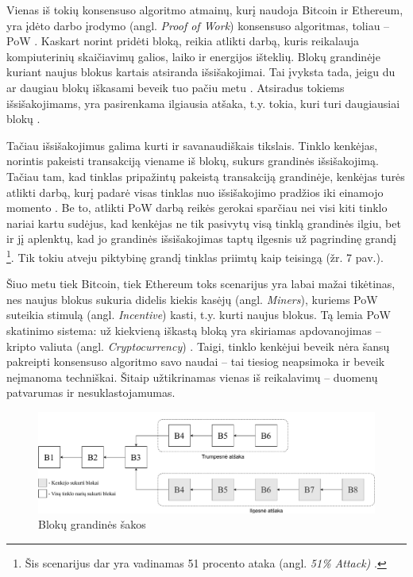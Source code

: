 Vienas iš tokių konsensuso algoritmo atmainų, kurį naudoja Bitcoin ir Ethereum, yra įdėto darbo įrodymo (angl. \textit{Proof of Work}) konsensuso algoritmas, toliau – PoW \cite{gervais2016security}. Kaskart norint pridėti bloką, reikia atlikti darbą, kuris reikalauja kompiuterinių skaičiavimų galios, laiko ir energijos išteklių. Blokų grandinėje kuriant naujus blokus kartais atsiranda išsišakojimai. Tai įvyksta tada, jeigu du ar daugiau blokų iškasami beveik tuo pačiu metu \cite{zheng2017overview}. Atsiradus tokiems išsišakojimams, yra pasirenkama ilgiausia atšaka, t.y. tokia, kuri turi daugiausiai blokų \cite{zheng2017overview}. 

Tačiau išsišakojimus galima kurti ir savanaudiškais tikslais. Tinklo kenkėjas, norintis pakeisti transakciją viename iš blokų, sukurs grandinės išsišakojimą. Tačiau tam, kad tinklas pripažintų pakeistą transakciją grandinėje, kenkėjas turės atlikti darbą, kurį padarė visas tinklas nuo išsišakojimo pradžios iki einamojo momento \cite{nakamoto2008bitcoin}. Be to, atlikti PoW darbą reikės gerokai sparčiau nei visi kiti tinklo nariai kartu sudėjus, kad kenkėjas ne tik pasivytų visą tinklą grandinės ilgiu, bet ir jį aplenktų, kad jo grandinės išsišakojimas taptų ilgesnis už pagrindinę grandį \cite{nakamoto2008bitcoin}\footnote{Šis scenarijus dar yra vadinamas 51 procento ataka (angl. \textit{51\% Attack)} \cite{baliga2017understanding}.}. Tik tokiu atveju piktybinę grandį tinklas priimtų kaip teisingą (žr. 7 pav.).

Šiuo metu tiek Bitcoin, tiek Ethereum toks scenarijus yra labai mažai tikėtinas, nes naujus blokus sukuria didelis kiekis kasėjų (angl. \textit{Miners}), kuriems PoW suteikia stimulą (angl. \textit{Incentive}) kasti, t.y. kurti naujus blokus. Tą lemia PoW skatinimo sistema: už kiekvieną iškastą bloką yra skiriamas apdovanojimas – kripto valiuta (angl. \textit{Cryptocurrency}) \cite{nakamoto2008bitcoin}. Taigi, tinklo kenkėjui beveik nėra šansų pakreipti konsensuso algoritmo savo naudai – tai tiesiog neapsimoka ir beveik neįmanoma techniškai. Šitaip užtikrinamas vienas iš reikalavimų – duomenų patvarumas ir nesuklastojamumas.

\begin{figure}[H]
    \centering
    \includegraphics[scale=0.5]{images/blockchain-branches}
    \caption{Blokų grandinės šakos}
\end{figure}




